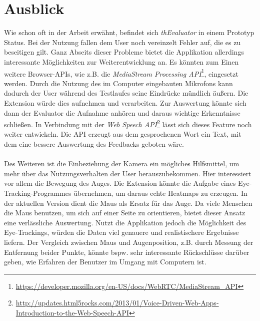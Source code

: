 %
%
%
%

\section{Ausblick}

Wie schon oft in der Arbeit erwähnt, befindet sich \textit{thEvaluator} in einem Prototyp Status. Bei der Nutzung fallen dem User noch vereinzelt Fehler auf, die es zu beseitigen gilt. Ganz Abseits dieser Probleme bietet die Applikation allerdings interessante Möglichkeiten zur Weiterentwicklung an. Es könnten zum Einen weitere Browser-APIs, wie z.B. die \textit{MediaStream Processing API}\footnote{\url{https://developer.mozilla.org/en-US/docs/WebRTC/MediaStream_API}}, eingesetzt werden. Durch die Nutzung des im Computer eingebauten Mikrofons kann dadurch der User während des Testlaufes seine Eindrücke mündlich äußern. Die Extension würde dies aufnehmen und verarbeiten. Zur Auswertung könnte sich dann der Evaluator die Aufnahme anhören und daraus wichtige Erkenntnisse schließen. In Verbindung mit der \textit{Web Speech API}\footnote{\url{http://updates.html5rocks.com/2013/01/Voice-Driven-Web-Apps-Introduction-to-the-Web-Speech-API}} lässt sich dieses Feature noch weiter entwickeln. Die API erzeugt aus dem gesprochenen Wort ein Text, mit dem eine bessere Auswertung des Feedbacks geboten wäre.\\
\\
Des Weiteren ist die Einbeziehung der Kamera ein mögliches Hilfsmittel, um mehr über das Nutzungsverhalten der User herauszubekommen. Hier interessiert vor allem die Bewegung des Auges. Die Extension könnte die Aufgabe eines Eye-Tracking-Programmes übernehmen, um daraus echte Heatmaps zu erzeugen. In der aktuellen Version dient die Maus als Ersatz für das Auge. Da viele Menschen die Maus benutzen, um sich auf einer Seite zu orientieren, bietet dieser Ansatz eine verlässliche Auswertung. Nutzt die Applikation jedoch die Möglichkeit des Eye-Trackings, würden die Daten viel genauere und realistischere Ergebnisse liefern. Der Vergleich zwischen Maus und Augenposition, z.B. durch Messung der Entfernung beider Punkte, könnte bspw. sehr interessante Rückschlüsse darüber geben, wie Erfahren der Benutzer im Umgang mit Computern ist.\\
